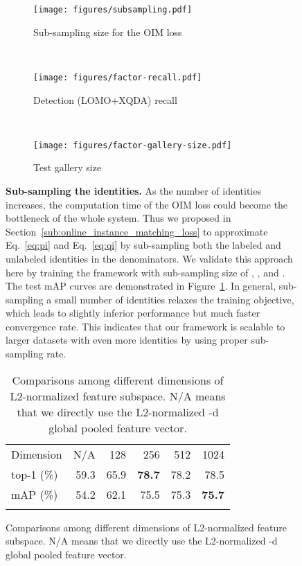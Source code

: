 \documentclass[10pt,twocolumn,letterpaper]{article}
\begin{document}
\begin{figure}[t]
\begin{center}
\begin{figure*}[t]
\begin{center}
\begin{subfigure}[t]{0.32\linewidth}
  \texttt{[image: figures/subsampling.pdf]}
  \caption{Sub-sampling size for the OIM loss}
  \label{fig:subsampling}
\end{subfigure}
~
\begin{subfigure}[t]{0.32\linewidth}
  \texttt{[image: figures/factor-recall.pdf]}
  \caption{Detection (LOMO+XQDA) recall}
  \label{fig:factor-recall}
\end{subfigure}
~
\begin{subfigure}[t]{0.32\linewidth}
  \texttt{[image: figures/factor-gallery-size.pdf]}
  \caption{Test gallery size}
  \label{fig:factor-gallery-size}
\end{subfigure}
\end{center}
\caption{Test mAP curves of different factors. The final mAPs are shown in the legend if applicable.}
\end{figure*}
\textbf{Sub-sampling the identities.} As the number of identities increases, the computation time of the OIM loss could become the bottleneck of the whole system. Thus we proposed in Section~\ref{sub:online_instance_matching_loss} to approximate Eq.~\eqref{eq:pi} and Eq.~\eqref{eq:qi} by sub-sampling both the labeled and unlabeled identities in the denominators. We validate this approach here by training the framework with sub-sampling size of , , and . The test mAP curves are demonstrated in Figure~\ref{fig:subsampling}. In general, sub-sampling a small number of identities relaxes the training objective, which leads to slightly inferior performance but much faster convergence rate. This indicates that our framework is scalable to larger datasets with even more identities by using proper sub-sampling rate.

\setlength{\tabcolsep}{8pt}
\begin{table}
\small
\begin{center}
\begin{tabular}{lrrrrr}
\hline\noalign{\smallskip}
\noalign{\smallskip}
Dimension & N/A & 128 & 256 & 512 & 1024 \\
\noalign{\smallskip}\hline\hline\noalign{\smallskip}
top-1 (\%) & 59.3 & 65.9 & \textbf{78.7} & 78.2 & 78.5 \\
mAP (\%) & 54.2 & 62.1 & 75.5 & 75.3 & \textbf{75.7} \\
\hline\noalign{\smallskip}
\end{tabular}
\end{center}
\vspace{-3ex}
\caption{Comparisons among different dimensions of L2-normalized feature subspace. N/A means that we directly use the L2-normalized -d global pooled feature vector.}
\vspace{-1ex}
\label{tab:embed-dim}
\end{table}
\setlength{\tabcolsep}{6pt}


\end{center}
\end{figure}
\end{document}
